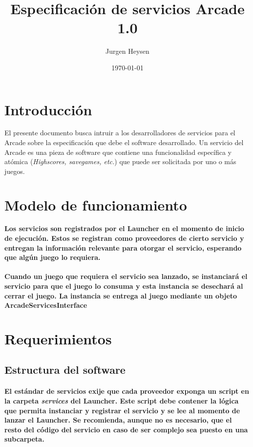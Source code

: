 \documentclass[language=spanish]{article}
\begin{document}
\title{Especificación de servicios Arcade 1.0}
\author{Jurgen Heysen}
\date{\today}
\maketitle
\newpage

\tableofcontents
\newpage

\section{Introducción}

El presente documento busca intruir a los desarrolladores de servicios para el Arcade sobre la especificación que debe el software desarrollado.
Un servicio del Arcade es una pieza de software que contiene una funcionalidad específica y atómica ({\em Highscores, savegames, etc.}) que puede ser solicitada por uno o más juegos.

\section{Modelo de funcionamiento}

\paragraph{Los servicios son registrados por el Launcher en el momento de inicio de ejecución. Estos se registran como proveedores de cierto servicio y entregan la información relevante para otorgar el servicio, esperando que algún juego lo requiera.}
\paragraph{Cuando un juego que requiera el servicio sea lanzado, se instanciará el servicio para que el juego lo consuma y esta instancia se desechará al cerrar el juego. La instancia se entrega al juego mediante un objeto ArcadeServicesInterface}

\section{Requerimientos}

\subsection{Estructura del software}

\paragraph{El estándar de servicios exije que cada proveedor exponga un script en la carpeta {\em services} del Launcher. Este script debe contener la lógica que permita instanciar y registrar el servicio y se lee al momento de lanzar el Launcher. Se recomienda, aunque no es necesario, que el resto del código del servicio en caso de ser complejo sea puesto en una subcarpeta.}
\end{document}
